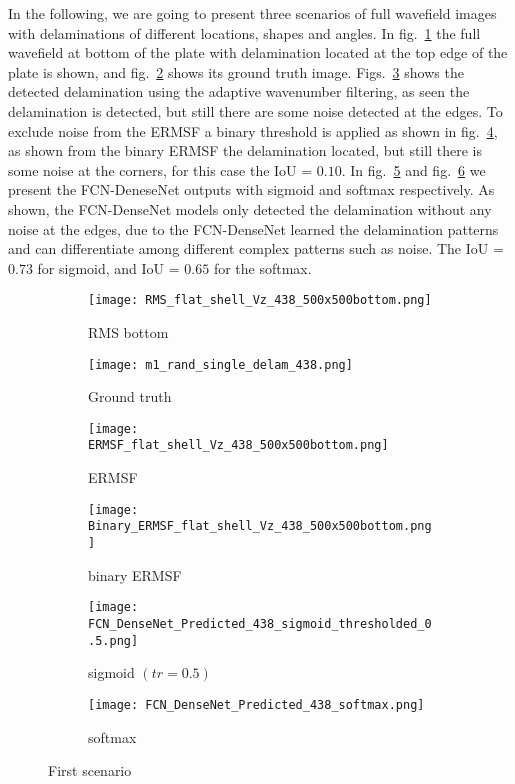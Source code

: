 	In the following, we are going to present three scenarios of full wavefield images with delaminations of different locations, shapes and angles.
	In fig.~\ref{fig:RMS_flat_shell_Vz_438} the full wavefield at bottom of the plate with delamination located at the top edge of the plate is shown, and fig.~\ref{fig:m1_rand_single_delam_438} shows its ground truth image. 
	Figs.~\ref{fig:ERMSF_flat_shell_Vz_438} shows the detected delamination using the adaptive wavenumber filtering, as seen the delamination is detected, but still there are some noise detected at the edges. 
	To exclude noise from the ERMSF a binary threshold is applied as shown in fig.~\ref{fig:Binary_ERMSF_flat_shell_Vz_438}, as shown from the binary ERMSF the delamination located, but still there is some noise at the corners, for this case the IoU = \(0.10\).
	In fig.~\ref{fig:predict_438_sigmoid_tr_0.5} and fig.~\ref{fig:predict_438_softmax} we present the FCN-DeneseNet outputs with sigmoid and softmax respectively.
	As shown, the FCN-DenseNet models only detected the delamination without any noise at the edges, due to the FCN-DenseNet learned the delamination patterns and can differentiate among different complex patterns such as noise.   
	The IoU = \(0.73\) for sigmoid, and IoU = \(0.65\) for the softmax.
	\begin{figure} [h!]
		\centering
		\begin{subfigure}[b]{0.47\textwidth}
			\centering
			\texttt{[image: RMS\_flat\_shell\_Vz\_438\_500x500bottom.png]}
			\caption{RMS bottom}
			\label{fig:RMS_flat_shell_Vz_438}
		\end{subfigure}
		\hfill
			\begin{subfigure}[b]{0.47\textwidth}
			\centering
			\texttt{[image: m1\_rand\_single\_delam\_438.png]}
			\caption{Ground truth}
			\label{fig:m1_rand_single_delam_438}
		\end{subfigure}
		\hfill
		\begin{subfigure}[b]{0.47\textwidth}
			\centering
			\texttt{[image: ERMSF\_flat\_shell\_Vz\_438\_500x500bottom.png]}
			\caption{ERMSF}
			\label{fig:ERMSF_flat_shell_Vz_438}
		\end{subfigure}
		\hfill
		\begin{subfigure}[b]{0.47\textwidth}
			\centering
			\texttt{[image: Binary\_ERMSF\_flat\_shell\_Vz\_438\_500x500bottom.png]}
			\caption{binary ERMSF}
			\label{fig:Binary_ERMSF_flat_shell_Vz_438}
		\end{subfigure}
		\hfill
		\begin{subfigure}[b]{0.47\textwidth}
			\centering
		\texttt{[image: FCN\_DenseNet\_Predicted\_438\_sigmoid\_thresholded\_0.5.png]}
		\caption{sigmoid \((tr = 0.5)\)}
		\label{fig:predict_438_sigmoid_tr_0.5}
		\end{subfigure}
		\hfill
		\begin{subfigure}[b]{0.47\textwidth}
			\centering
			\texttt{[image: FCN\_DenseNet\_Predicted\_438\_softmax.png]}
			\caption{softmax}
			\label{fig:predict_438_softmax}
		\end{subfigure}
		\caption{First scenario}
		\label{fig:RMS438}
	\end{figure} 
